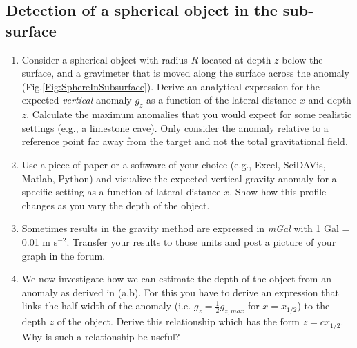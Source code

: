 \subsection{Detection of a spherical object in the sub-surface}
\label{Sec:SphereInSubsurface}
\begin{enumerate}[label=(\alph*)]
  \item Consider a spherical object with radius $R$ located at depth $z$ below the surface, and a gravimeter that is moved along the surface across the anomaly (Fig.\ref{Fig:SphereInSubsurface}). Derive an analytical expression for the expected \textit{vertical} anomaly $g_z$ as a function of the lateral distance $x$ and depth $z$. Calculate the maximum anomalies that you would expect for some realistic settings (e.g., a limestone cave). Only consider the anomaly relative to a reference point far away from the target and not the total gravitational field.

  \item Use a piece of paper or a software of your choice (e.g., Excel, SciDAVis, Matlab, Python) and visualize the expected vertical gravity anomaly for a specific setting as a function of lateral distance $x$. Show how this profile changes as you vary the depth of the object. 

  \item Sometimes results in the gravity method are expressed in \textit{mGal} with 1 Gal = 0.01 m s$^{-2}$. Transfer your results to those units and post a picture of your graph in the forum.

  \item We now investigate how we can estimate the depth of the object from an anomaly as derived in (a,b). For this you have to derive an expression that links the half-width of the anomaly (i.e. $g_z = \frac{1}{2}g_{z,max}$ for $x=x_{1/2}$) to the depth $z$ of the object. Derive this relationship which has the form $z = c x_{1/2}$. Why is such a relationship be useful?
\end{enumerate}

